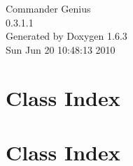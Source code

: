 \documentclass[a4paper]{book}
\begin{document}
\hypersetup{pageanchor=false}
\begin{titlepage}
\vspace*{7cm}
\begin{center}
{\Large Commander Genius \\[1ex]\large 0.3.1.1 }\\
\vspace*{1cm}
{\large Generated by Doxygen 1.6.3}\\
\vspace*{0.5cm}
{\small Sun Jun 20 10:48:13 2010}\\
\end{center}
\end{titlepage}
\clearemptydoublepage
{}
\tableofcontents
\clearemptydoublepage
{}
\hypersetup{pageanchor=true}
\chapter{Class Index}

\chapter{Class Index}

\end{document}
